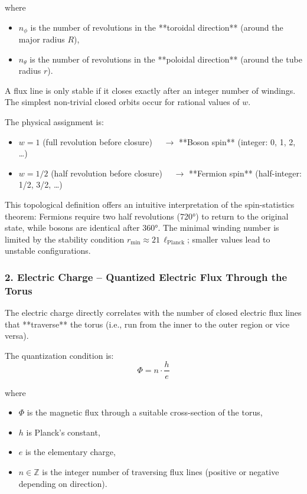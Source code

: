 where
\begin{itemize}
	\item $n_\phi$ is the number of revolutions in the **toroidal direction** (around the major radius $R$),
	\item $n_\theta$ is the number of revolutions in the **poloidal direction** (around the tube radius $r$).
\end{itemize}

A flux line is only stable if it closes exactly after an integer number of windings. The simplest non-trivial closed orbits occur for rational values of $w$.

The physical assignment is:
\begin{itemize}
	\item $w = 1$ \quad (full revolution before closure) $\quad \to$ **Boson spin** (integer: 0, 1, 2, …)
	\item $w = 1/2$ \quad (half revolution before closure) $\quad \to$ **Fermion spin** (half-integer: 1/2, 3/2, …)
\end{itemize}

This topological definition offers an intuitive interpretation of the spin-statistics theorem: Fermions require two half revolutions (720°) to return to the original state, while bosons are identical after 360°. The minimal winding number is limited by the stability condition $r_{\min} \approx 21 \, \ell_{\text{Planck}}$; smaller values lead to unstable configurations.

\subsubsection{2. Electric Charge – Quantized Electric Flux Through the Torus}

The electric charge directly correlates with the number of closed electric flux lines that **traverse** the torus (i.e., run from the inner to the outer region or vice versa).

The quantization condition is:
\begin{equation}
	\Phi = n \cdot \frac{h}{e}
	\label{eq:flux_quantization}
\end{equation}

where
\begin{itemize}
	\item $\Phi$ is the magnetic flux through a suitable cross-section of the torus,
	\item $h$ is Planck's constant,
	\item $e$ is the elementary charge,
	\item $n \in \mathbb{Z}$ is the integer number of traversing flux lines (positive or negative depending on direction).
\end{itemize}

